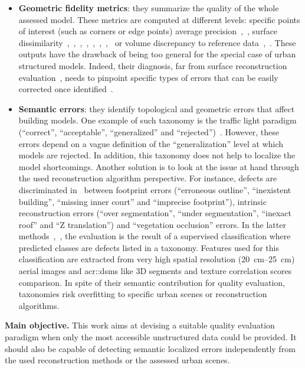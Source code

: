 \documentclass[runningheads]{llncs}
\begin{document}
\begin{itemize}
    \item \textbf{Geometric fidelity metrics}: they summarize the quality of the whole assessed model. These metrics are computed at different levels: specific points of interest (such as corners or edge points) average precision~\cite{vogtle2003quality},~\cite{Kaartinen2005}, surface dissimilarity~\cite{jaynes2003recognition},~\cite{dick2004modelling},~\cite{Kaartinen2005},~\cite{zebedin2008fusion},~\cite{lafarge2012creating},~\cite{Zeng2014},~\cite{li2016boxfitting},~\cite{nan2017polyfit} or volume discrepancy to reference data~\cite{jaynes2003recognition},~\cite{Zeng2014}. These outputs have the drawback of being too general for the special case of urban structured models. Indeed, their diagnosis, far from surface reconstruction evaluation~\cite{berger2013benchmark}, needs to pinpoint specific types of errors that can be easily corrected once identified~\cite{OudeElberink2010}.
    \item \textbf{Semantic errors}: they identify topological and geometric errors that affect building models. One example of such taxonomy is the traffic light paradigm (``correct'', ``acceptable'', ``generalized'' and ``rejected'')~\cite{boudet2006supervised}. However, these errors depend on a vague definition of the ``generalization'' level at which models are rejected. In addition, this taxonomy does not help to localize the model shortcomings. Another solution is to look at the issue at hand through the used reconstruction algorithm perspective. For instance, defects are discriminated in~\cite{Michelin2013} between footprint errors (``erroneous outline'', ``inexistent building'', ``missing inner court'' and ``imprecise footprint''), intrinsic reconstruction errors (``over segmentation'', ``under segmentation'', ``inexact roof'' and ``Z translation'') and ``vegetation occlusion'' errors. In the latter methods~\cite{boudet2006supervised},~\cite{Michelin2013}, the evaluation is the result of a supervised classification where predicted classes are defects listed in a taxonomy. Features used for this classification are extracted from very high spatial resolution (\SIrange{20}{25}{\cm}) aerial images and \glspl{acr::dsm} like 3D segments and texture correlation scores comparison. In spite of their semantic contribution for quality evaluation, taxonomies risk overfitting to specific urban scenes or reconstruction algorithms.
\end{itemize}

\noindent
\textbf{Main objective.}
This work aims at devising a suitable quality evaluation paradigm when only the most accessible unstructured data could be provided. It should also be capable of detecting semantic localized errors independently from the used reconstruction methods or the assessed urban scenes.
\end{document}
